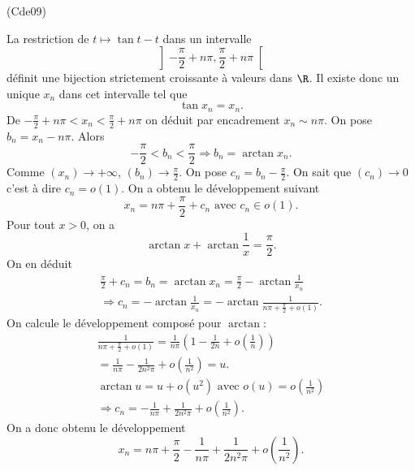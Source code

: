 \begin{tiny}(Cde09)\end{tiny} La restriction de $t\mapsto \tan t - t$ dans un intervalle 
\[
 \left] -\frac{\pi}{2} + n\pi , \frac{\pi}{2} + n\pi\right[ 
\]
définit une bijection strictement croissante à valeurs dans $\R$. Il existe donc un unique $x_n$ dans cet intervalle tel que 
\[
 \tan x_n = x_n.
\]
De $-\frac{\pi}{2} + n\pi < x_n < \frac{\pi}{2} + n\pi$ on déduit par encadrement $x_n \sim n\pi$.\newline
On pose $b_n = x_n - n\pi$. Alors
\[
 -\frac{\pi}{2} < b_n < \frac{\pi}{2} \Rightarrow b_n = \arctan x_n.
\]
Comme $(x_n)\rightarrow +\infty$, $(b_n)\rightarrow \frac{\pi}{2}$. On pose $c_n = b_n - \frac{\pi}{2}$. On sait que $(c_n)\rightarrow 0$ c'est à dire $c_n = o(1)$. On a obtenu le développement suivant
\[
 x_n = n\pi + \frac{\pi}{2} + c_n \text{ avec } c_n \in o(1).
\]
Pour tout $x>0$, on a
\[
 \arctan x + \arctan \frac{1}{x} = \frac{\pi}{2}.
\]
On en déduit
\begin{multline*}
 \frac{\pi}{2} + c_n = b_n = \arctan x_n = \frac{\pi}{2} - \arctan \frac{1}{x_n}\\
 \Rightarrow c_n = - \arctan \frac{1}{x_n}
 = - \arctan \frac{1}{n\pi + \frac{\pi}{2} + o(1)}.
\end{multline*}
On calcule le développement composé pour $\arctan$:
\begin{multline*}
 \frac{1}{n\pi + \frac{\pi}{2} + o(1)} = \frac{1}{n\pi}\left( 1 - \frac{1}{2n} + o(\frac{1}{n})\right)\\
 = \frac{1}{n\pi} - \frac{1}{2n^2\pi} + o(\frac{1}{n^2}) = u.\\
\arctan u = u + o(u^2) \text{ avec } o(u) = o(\frac{1}{n^2}) \\
\Rightarrow 
c_n = -\frac{1}{n\pi} + \frac{1}{2n^2\pi} + o(\frac{1}{n^2}). 
\end{multline*}
On a donc obtenu le développement
\[
 x_n = n\pi + \frac{\pi}{2} - \frac{1}{n\pi} + \frac{1}{2n^2\pi} + o(\frac{1}{n^2}).
\]

 